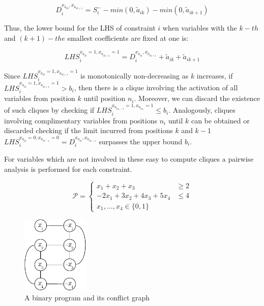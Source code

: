 \documentclass{endm}
\begin{document}
\begin{equation}\label{di}
D_{i}^{x_{\acute{a}_{ik}}, x_{\acute{a}_{ik+1}}} = S_i^- - min(0, \tilde{a}_{ik}) - min(0, \tilde{a}_{ik+1})
\end{equation}

\noindent Thus, the lower bound for the LHS of constraint $i$ when variables with the $k-th$ and $(k+1)-the$ smallest coefficients are fixed at one is:

\begin{equation}
LHS_{i}^{x_{\acute{a}_{ik}} = 1, x_{\acute{a}_{ik+1}} = 1} = D_{i}^{x_{\acute{a}_{ik}}, x_{\acute{a}_{ik+1}}} + \tilde{a}_{ik} + \tilde{a}_{ik+1}
\end{equation}

Since $LHS_{i}^{x_{\acute{a}_{ik}} = 1, x_{\acute{a}_{ik+1}} = 1}$ is monotonically non-decreasing as $k$ increases, if $LHS_{i}^{x_{\acute{a}_{ik}} = 1, x_{\acute{a}_{ik+1}} = 1} > b_{i}$, then there is a clique involving the activation of all variables from position $k$ until position $n_i$. Moreover, we can discard the existence of such cliques by checking if $LHS_{i}^{x_{\acute{a}_{in_i-1}} = 1, x_{\acute{a}_{in_i}} = 1} \leq b_i$. Analogously, cliques involving complimentary variables from positions $n_i$ until $k$ can be obtained or discarded checking if the limit incurred from positions $k$ and $k-1$  $LHS_{i}^{x_{\acute{a}_{ik}} = 0, x_{\acute{a}_{ik-1}} = 0} = D_{i}^{x_{\acute{a}_{ik}}, x_{\acute{a}_{ik-1}}} $ surpasses the upper bound $b_i$.

For variables which are not involved in these easy to compute cliques a pairwise analysis is performed for each constraint. 



\begin{figure}[h]
\begin{minipage}[b]{.5\textwidth}
\[
\mathcal{P} = \left\{
\begin{array}{lr}
x_1+x_2+x_3 & \geq 2 \\
-2x_{1}+3x_{2}+4x_{3}+5x_{4} & \leq 4 \\
x_{1},\ldots,x_{4}\in\{0,1\}
\end{array}
\right.
\]

\end{minipage}
\begin{minipage}{.5\textwidth}
	\centering
	\includegraphics[width=3.2cm]{cGraph.pdf}
\end{minipage}
\caption{A binary program and its conflict graph}\label{graph}
\end{figure}
\end{document}
